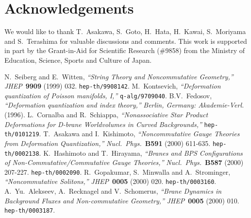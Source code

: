 \documentclass[12pt,a4paper]{article}
\begin{document}
\section*{Acknowledgements}
We would like to thank T.~Asakawa, S.~Goto, H.~Hata, H.~Kawai,
S.~Moriyama and S.~Terashima for valuable discussions and comments.
This work is supported in part by the Grant-in-Aid for Scientific
Research (\#9858) from the Ministry of Education, Science, Sports and
Culture of Japan.

\begin{thebibliography}{99}
N.~Seiberg and E.~Witten,
{\it ``String Theory and Noncommutative Geometry,''}
{\sl JHEP}~{\bf 9909} (1999) 032.
{\tt hep-th/9908142}.
M.~Kontsevich,
{\it ``Deformation quantization of Poisson manifolds, I,''}
{\tt q-alg/9709040}.
B.V.~Fedosov,
{\it ``Deformation quantization and index theory,''}
{\sl  Berlin, Germany: Akademie-Verl.} (1996).
L.~Cornalba and R.~Schiappa,
{\it ``Nonassociative Star Product Deformations for D-brane
  Worldvolumes in Curved Backgrounds,''}
{\tt hep-th/0101219}.
T.~Asakawa and I.~Kishimoto,
{\it ``Noncommutative Gauge Theories from Deformation Quantization,''}
{\sl Nucl.~Phys.}~{\bf B591} (2000) 611-635. {\tt hep-th/0002138}.
K.~Hashimoto and T.~Hirayama,
{\it ``Branes and BPS Configurations of Non-Commutative/Commutative Gauge
Theories,''}
{\sl Nucl.~Phys.}~{\bf B587} (2000) 207-227.
{\tt hep-th/0002090}.
R.~Gopakumar, S.~Minwalla and A.~Strominger,
{\it ``Noncommutative Solitons,''}
{\sl JHEP}~{\bf 0005} (2000) 020.
{\tt hep-th/0003160}.
A.~Yu.~Alekseev, A.~Recknagel and  V.~Schomerus,
{\it ``Brane Dynamics in Background Fluxes and Non-commutative
Geometry,''}
{\sl JHEP}~{\bf 0005} (2000) 010.
{\tt hep-th/0003187}.
\end{thebibliography}
\end{document}
